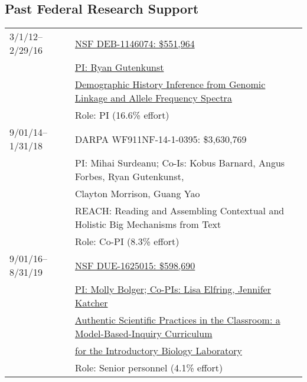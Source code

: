 \documentclass[11pt]{article}
\begin{document}
\subsection*{Past Federal Research Support}
\begin{longtable}[l]{l l}
3/1/12--2/29/16 & \href{http://www.nsf.gov/awardsearch/showAward?AWD_ID=1146074}{NSF DEB-1146074: \$551,964}\\
                  & \href{http://www.nsf.gov/awardsearch/showAward?AWD_ID=1146074}{PI: Ryan Gutenkunst}\\
                  & \href{http://www.nsf.gov/awardsearch/showAward?AWD_ID=1146074}{Demographic History Inference from Genomic Linkage and Allele Frequency Spectra}\\
                  & Role: PI (16.6\% effort)\\
9/01/14--1/31/18 & DARPA WF911NF-14-1-0395: \$3,630,769\\
                  & PI: Mihai Surdeanu; Co-Is: Kobus Barnard, Angus Forbes, Ryan Gutenkunst,\\
                  & Clayton Morrison, Guang Yao\\
                  & REACH: Reading and Assembling Contextual and Holistic Big Mechanisms from Text\\
                  & Role: Co-PI (8.3\% effort)\\
9/01/16--8/31/19 & \href{https://www.nsf.gov/awardsearch/showAward?AWD_ID=1625015}{NSF DUE-1625015: \$598,690}\\
                  & \href{https://www.nsf.gov/awardsearch/showAward?AWD_ID=1625015}{PI: Molly Bolger; Co-PIs: Lisa Elfring, Jennifer Katcher}\\
                  &  \href{https://www.nsf.gov/awardsearch/showAward?AWD_ID=1625015}{Authentic Scientific Practices in the Classroom: a Model-Based-Inquiry Curriculum}\\
                  &\href{https://www.nsf.gov/awardsearch/showAward?AWD_ID=1625015}{for the Introductory Biology Laboratory}\\
                  & Role: Senior personnel (4.1\% effort)\\
\end{longtable}
\end{document}
